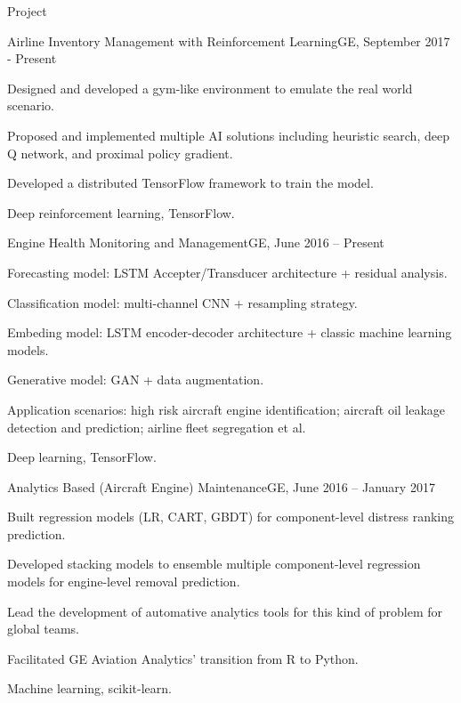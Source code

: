 \documentclass{resume} %
\begin{document}
\begin{rSection}{Project}

\begin{rSubsection}{Airline Inventory Management with Reinforcement Learning}{}{GE, September 2017 - Present}{}
\item Designed and developed a gym-like environment to emulate the real world scenario.
\item Proposed and implemented multiple AI solutions including heuristic search, deep Q network, and proximal policy gradient.
\item Developed a distributed TensorFlow framework to train the model.
\item Deep reinforcement learning, TensorFlow.
\end{rSubsection}


\begin{rSubsection}{Engine Health Monitoring and Management}{}{GE, June 2016 – Present}{}
\item Forecasting model: LSTM Accepter/Transducer architecture + residual analysis.
\item Classification model: multi-channel CNN + resampling strategy.
\item Embeding model: LSTM encoder-decoder architecture + classic machine learning models.
\item Generative model: GAN + data augmentation.
\item Application scenarios: high risk aircraft engine identification; aircraft oil leakage detection and prediction; airline fleet segregation et al.
\item Deep learning, TensorFlow.
\end{rSubsection}


\begin{rSubsection}{Analytics Based (Aircraft Engine) Maintenance}{}{GE, June 2016 – January 2017}{}
\item Built regression models (LR, CART, GBDT) for component-level distress ranking prediction.
\item Developed stacking models to ensemble multiple component-level regression models for engine-level removal prediction.
\item Lead the development of automative analytics tools for this kind of problem for global teams.
\item Facilitated GE Aviation Analytics' transition from R to Python.
\item Machine learning, scikit-learn.
\end{rSubsection}


\end{rSection}
\end{document}
